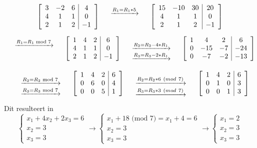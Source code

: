 \documentclass[11pt,a4paper,titlepage]{article}
\newcommand\arrows[3]{
	\quad
        \begin{array}{c}
        \ifx\relax#1\relax\else \xrightarrow{#1}\fi\\
        \ifx\relax#2\relax\else \xrightarrow{#2}\fi\\
        \ifx\relax#3\relax\else \xrightarrow{#3}\fi
        \end{array}
	\quad
}
\begin{document}
\[
\left[
\begin{array}{ccc|c}
3 & -2 & 6 & 4 \\
4 & 1 & 1 & 0 \\
2 & 1 & 2 & -1 \\
\end{array}
\right]
\arrows{R_1 = R_1 * 5}{}{}
\left[
\begin{array}{ccc|c}
15 & -10 & 30 & 20 \\
4 & 1 & 1 & 0 \\
2 & 1 & 2 & -1 \\
\end{array}
\right]
\]
\[
\arrows{R_1 = R_1 \text{ mod } 7}{}{}
\left[
\begin{array}{ccc|c}
1 & 4 & 2 & 6 \\
4 & 1 & 1 & 0 \\
2 & 1 & 2 & -1 \\
\end{array}
\right]
\arrows{}{R_2 = R_2 - 4*R_1}{R_3 = R_3 - 2*R_1}
\left[
\begin{array}{ccc|c}
1 & 4 & 2 & 6 \\
0 & -15 & -7 & -24 \\
0 & -7 & -2 & -13 \\
\end{array}
\right]
\]
\[
\arrows{}{R_2 = R_2 \text{ mod } 7}{R_3 =R_3 \text{ mod } 7}
\left[
\begin{array}{ccc|c}
1 & 4 & 2 & 6 \\
0 & 6 & 0 & 4 \\
0 & 0 & 5 & 1\\
\end{array}
\right]
\arrows{}{R_2 = R_2 * 6 ~ (mod ~7)}{R_3 = R_3 * 3 ~(mod ~7)}
\left[
\begin{array}{ccc|c}
1 & 4 & 2 & 6 \\
0 & 1 & 0 & 3 \\
0 & 0 & 1 & 3\\
\end{array}
\right]
\]
Dit resulteert in
$$
\begin{cases}
	x_1 + 4x_2 + 2x_3 = 6\\
	x_2 = 3 \\
	x_3 = 3
\end{cases}
\rightarrow
\begin{cases}
	x_1 + 18 \text{ (mod }7) = x_1 + 4 = 6\\
	x_2 = 3 \\
	x_3 = 3
\end{cases}
\rightarrow
\begin{cases}
	x_1 = 2\\
	x_2 = 3 \\
	x_3 = 3
\end{cases}
$$
\end{document}
